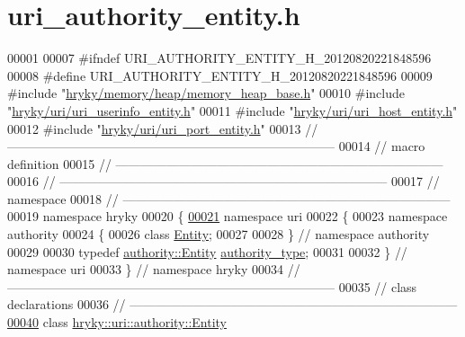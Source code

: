 \hypertarget{uri__authority__entity_8h_source}{\section{uri\-\_\-authority\-\_\-entity.\-h}
}

\begin{DoxyCode}
00001 
00007 \textcolor{preprocessor}{#ifndef URI\_AUTHORITY\_ENTITY\_H\_20120820221848596}
00008 \textcolor{preprocessor}{}\textcolor{preprocessor}{#define URI\_AUTHORITY\_ENTITY\_H\_20120820221848596}
00009 \textcolor{preprocessor}{}\textcolor{preprocessor}{#include "\hyperlink{memory__heap__base_8h}{hryky/memory/heap/memory_heap_base.h}"}
00010 \textcolor{preprocessor}{#include "\hyperlink{uri__userinfo__entity_8h}{hryky/uri/uri_userinfo_entity.h}"}
00011 \textcolor{preprocessor}{#include "\hyperlink{uri__host__entity_8h}{hryky/uri/uri_host_entity.h}"}
00012 \textcolor{preprocessor}{#include "\hyperlink{uri__port__entity_8h}{hryky/uri/uri_port_entity.h}"}
00013 \textcolor{comment}{//
      ------------------------------------------------------------------------------}
00014 \textcolor{comment}{// macro definition}
00015 \textcolor{comment}{//
      ------------------------------------------------------------------------------}
00016 \textcolor{comment}{//
      ------------------------------------------------------------------------------}
00017 \textcolor{comment}{// namespace}
00018 \textcolor{comment}{//
      ------------------------------------------------------------------------------}
00019 \textcolor{keyword}{namespace }hryky
00020 \{
\hypertarget{uri__authority__entity_8h_source_l00021}{}\hyperlink{namespacehryky_1_1uri}{00021} \textcolor{keyword}{namespace }uri
00022 \{
00023 \textcolor{keyword}{namespace }authority
00024 \{
00026     \textcolor{keyword}{class }\hyperlink{classhryky_1_1uri_1_1_entity}{Entity};
00027 
00028 \} \textcolor{comment}{// namespace authority}
00029 
00030 \textcolor{keyword}{typedef} \hyperlink{classhryky_1_1uri_1_1authority_1_1_entity}{authority::Entity} \hyperlink{classhryky_1_1uri_1_1authority_1_1_entity}{authority_type};
00031 
00032 \} \textcolor{comment}{// namespace uri}
00033 \} \textcolor{comment}{// namespace hryky}
00034 \textcolor{comment}{//
      ------------------------------------------------------------------------------}
00035 \textcolor{comment}{// class declarations}
00036 \textcolor{comment}{//
      ------------------------------------------------------------------------------}
\hypertarget{uri__authority__entity_8h_source_l00040}{}\hyperlink{classhryky_1_1uri_1_1authority_1_1_entity}{00040} \textcolor{comment}{}\textcolor{keyword}{class }\hyperlink{classhryky_1_1uri_1_1authority_1_1_entity}{hryky::uri::authority::Entity}

\end{DoxyCode}
